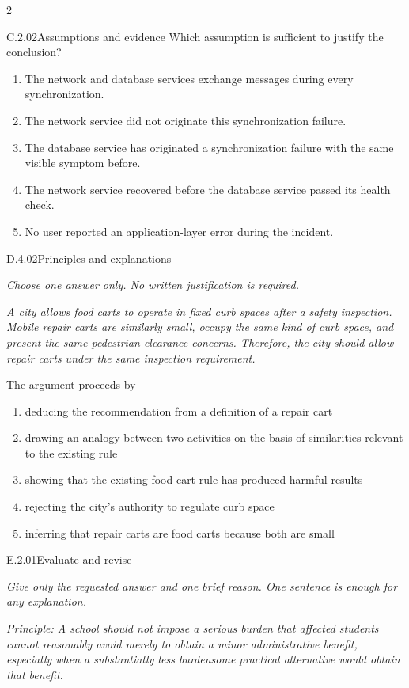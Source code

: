 \documentclass[9pt]{extarticle}
\newcommand{\choice}[1]{\item #1}
\begin{document}
\begin{multicols}{2}
\begin{DenseCoreProblem}{C.2.02}{Assumptions and evidence}
Which assumption is sufficient to justify the conclusion?
\begin{enumerate}[label=(\alph*)]
  \choice{The network and database services exchange messages during every synchronization.}
  \choice{The network service did not originate this synchronization failure.}
  \choice{The database service has originated a synchronization failure with the same visible symptom before.}
  \choice{The network service recovered before the database service passed its health check.}
  \choice{No user reported an application-layer error during the incident.}
\end{enumerate}
\end{DenseCoreProblem}
\begin{DenseCoreProblem}{D.4.02}{Principles and explanations}
{\scriptsize\textit{Choose one answer only. No written justification is required.}\par}
\emph{A city allows food carts to operate in fixed curb spaces after a safety inspection. Mobile repair carts are similarly small, occupy the same kind of curb space, and present the same pedestrian-clearance concerns. Therefore, the city should allow repair carts under the same inspection requirement.}

The argument proceeds by
\begin{enumerate}[label=(\alph*)]
  \choice{deducing the recommendation from a definition of a repair cart}
  \choice{drawing an analogy between two activities on the basis of similarities relevant to the existing rule}
  \choice{showing that the existing food-cart rule has produced harmful results}
  \choice{rejecting the city's authority to regulate curb space}
  \choice{inferring that repair carts are food carts because both are small}
\end{enumerate}
\end{DenseCoreProblem}
\begin{DenseCoreProblem}{E.2.01}{Evaluate and revise}
{\scriptsize\textit{Give only the requested answer and one brief reason. One sentence is enough for any explanation.}\par}
\emph{Principle: A school should not impose a serious burden that affected students cannot reasonably avoid merely to obtain a minor administrative benefit, especially when a substantially less burdensome practical alternative would obtain that benefit.}


\end{DenseCoreProblem}
\end{multicols}
\end{document}
